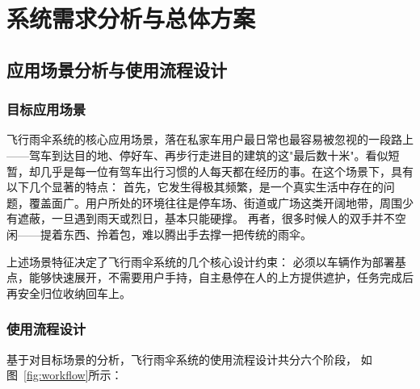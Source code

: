 
\chapter{系统需求分析与总体方案}

\section{应用场景分析与使用流程设计}

\subsection{目标应用场景}

飞行雨伞系统的核心应用场景，落在私家车用户最日常也最容易被忽视的一段路上——驾车到达目的地、停好车、再步行走进目的建筑的这"最后数十米"。看似短暂，却几乎是每一位有驾车出行习惯的人每天都在经历的事。在这个场景下，具有以下几个显著的特点：
首先，它发生得极其频繁，是一个真实生活中存在的问题，覆盖面广。用户所处的环境往往是停车场、街道或广场这类开阔地带，周围少有遮蔽，一旦遇到雨天或烈日，基本只能硬撑。
再者，很多时候人的双手并不空闲——提着东西、拎着包，难以腾出手去撑一把传统的雨伞。

上述场景特征决定了飞行雨伞系统的几个核心设计约束：
必须以车辆作为部署基点，能够快速展开，不需要用户手持，自主悬停在人的上方提供遮护，任务完成后再安全归位收纳回车上。




\subsection{使用流程设计}

基于对目标场景的分析，飞行雨伞系统的使用流程设计共分六个阶段，
如图~\ref{fig:workflow}所示：

